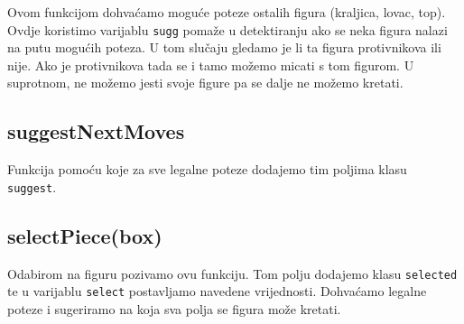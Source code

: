 \documentclass{article}
\begin{document}
Ovom funkcijom dohvaćamo moguće poteze ostalih figura (kraljica, lovac, top). Ovdje koristimo varijablu \verb|sugg| pomaže u detektiranju ako se neka figura nalazi na putu mogućih poteza. U tom slučaju gledamo je li ta figura protivnikova ili nije. Ako je protivnikova tada se i tamo možemo micati s tom figurom. U suprotnom, ne možemo jesti svoje figure pa se dalje ne možemo kretati.

\subsection{suggestNextMoves}

Funkcija pomoću koje za sve legalne poteze dodajemo tim poljima klasu \\
\verb|suggest|.

\subsection{selectPiece(box)}

Odabirom na figuru pozivamo ovu funkciju. Tom polju dodajemo klasu \verb|selected| te u varijablu \verb|select| postavljamo navedene vrijednosti. Dohvaćamo legalne poteze i sugeriramo na koja sva polja se figura može kretati.
\end{document}
